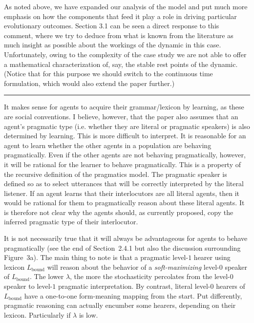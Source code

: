 \documentclass[12pt,a4paper]{article}
\begin{document}
As noted above, we have expanded our analysis of the model and put much more emphasis on how the components that feed it play a role in driving particular evolutionary outcomes. Section 3.1 can be seen a direct response to this comment, where we try to deduce from what is known from the literature as much insight as possible about the workings of the dynamic in this case. Unfortunately, owing to the complexity of the case study we are not able to offer a mathematical characterization of, say, the stable rest points of the dynamic. (Notice that for this purpose we should switch to the continuous time formulation, which would also extend the paper further.)
%

\vspace{0.5cm}

\noindent\rule{\textwidth}{1pt}

\begin{mdframed}[backgroundcolor=gray!25,linecolor=gray!25,frametitle= Reviewer \thereviewerCounter~comment \thereviewerCommentCounter \hfill ~~({\it co-evolution and pragmatic maintenance})]
%
It makes sense for agents to acquire their grammar/lexicon by learning, as these are social conventions. I believe, however, that the paper also assumes that an agent's pragmatic type (i.e. whether they are literal or pragmatic speakers) is also determined by learning. This is more difficult to interpret. It is reasonable for an agent to learn whether the other agents in a population are behaving pragmatically. Even if the other agents are not behaving pragmatically, however, it will be rational for the learner to behave pragmatically. This is a property of the recursive definition of the pragmatics model. The pragmatic speaker is defined so as to select utterances that will be correctly interpreted by the literal listener. If an agent learns that their interlocutors are all literal agents, then it would be rational for them to pragmatically reason about these literal agents. It is therefore not clear why the agents should, as currently proposed, copy the inferred pragmatic type of their interlocutor.
\end{mdframed}

It is not necessarily true that it will always be advantageous for agents to behave pragmatically (see the end of Section~2.4.1 but also the discussion surrounding Figure~3a).  The main thing to note is that a pragmatic level-$1$ hearer using lexicon $L_{\text{bound}}$ will reason about the behavior of a {\em soft-maximizing} level-$0$ speaker of $L_{\text{bound}}$. The lower $\lambda$, the more the stochasticity percolates from the level-$0$ speaker to level-$1$ pragmatic interpretation. By contrast, literal level-$0$ hearers of $L_{\text{bound}}$ have a one-to-one form-meaning mapping from the start. Put differently, pragmatic reasoning can actually encumber some hearers, depending on their lexicon. Particularly if $\lambda$ is low.
\end{document}
